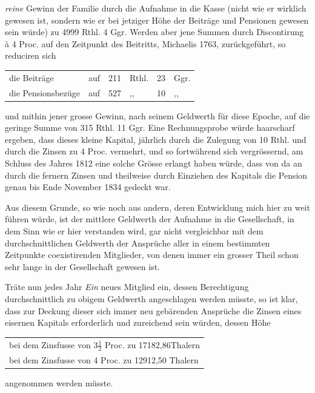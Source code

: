 \textit{reine} Gewinn der Familie durch die Aufnahme in die Kasse (nicht wie er wirklich gewesen ist, sondern wie er bei jetziger Höhe der Beiträge und Pensionen gewesen sein würde) zu 4999 Rthl. 4 Ggr. Werden aber jene Summen durch Discontirung à 4 Proc. auf den Zeitpunkt des Beitritts, Michaelis 1763, zurückgeführt, so reduciren sich
\begin{center}
\begin{tabular}{l l r l r l}
die Beiträge&auf&211&Rthl.&23&Ggr.\\
die Pensionsbezüge&auf&527&,,&10&,,
\end{tabular}
\end{center}
\noindent und mithin jener grosse Gewinn, nach seinem Geldwerth für diese Epoche, auf die geringe Summe von 315 Rthl. 11 Ggr. Eine Rechnungsprobe würde haarscharf ergeben, dass dieses kleine Kapital, jährlich durch die Zulegung von 10 Rthl. und durch die Zinsen zu 4 Proc. vermehrt, und so fortwährend sich vergrössernd, am Schluss des Jahres 1812 eine solche Grösse erlangt haben würde, dass von da an durch die fernern Zinsen und theilweise durch Einziehen des Kapitals die Pension genau bis Ende November 1834 gedeckt war.

Aus diesem Grunde, so wie noch aus andern, deren Entwicklung mich hier zu weit führen würde, ist der mittlere Geldwerth der Aufnahme in die Gesellschaft, in dem Sinn wie er hier verstanden wird, gar nicht vergleichbar mit dem durchschnittlichen Geldwerth der Ansprüche aller in einem bestimmten Zeitpunkte coexistirenden Mitglieder, von denen immer ein grosser Theil schon sehr lange in der Gesellschaft gewesen ist.

Träte nun jedes Jahr \textit{Ein} neues Mitglied ein, dessen Berechtigung durchschnittlich zu obigem Geldwerth angeschlagen werden müsste, so ist klar, dass zur Deckung dieser sich immer neu gebärenden Ansprüche die Zinsen eines eisernen Kapitals erforderlich und zureichend sein würden, dessen Höhe
\begin{center}
\begin{tabular}{l}
bei dem Zinsfusse von \(3\tfrac{1}{2}\) Proc. zu 17182,86Thalern\\
bei dem Zinsfusse von 4 Proc. zu 12912,50 Thalern
\end{tabular}
\end{center}
\noindent angenommen werden müsste.

